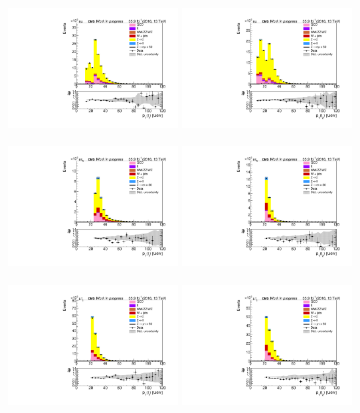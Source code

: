 \begin{figure}[htp]
	\centering
	\includegraphics[width=0.4\textwidth]{plots/em/TransverseMomentum1_ZTTCR.pdf}
	\includegraphics[width=0.4\textwidth]{plots/em/TransverseMomentum2_ZTTCR.pdf}
	
	\includegraphics[width=0.4\textwidth]{plots/et/TransverseMomentum1_ZTTCR.pdf}
	\includegraphics[width=0.4\textwidth]{plots/et/TransverseMomentum2_ZTTCR.pdf}

	\includegraphics[width=0.4\textwidth]{plots/mt/TransverseMomentum1_ZTTCR.pdf}
	\includegraphics[width=0.4\textwidth]{plots/mt/TransverseMomentum2_ZTTCR.pdf}


\end{figure}
